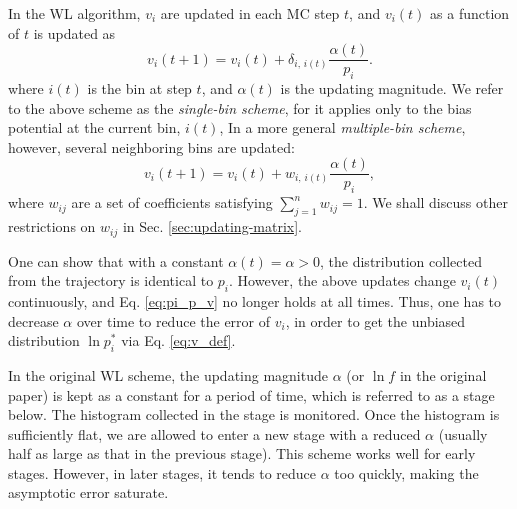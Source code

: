 \documentclass[reprint]{revtex4-1}
\begin{document}
In the WL algorithm\cite{wang2001, wang2001pre},
$v_i$ are updated
in each MC step $t$,
and $v_i(t)$ as a function of $t$
is updated as
%
\begin{equation}
  v_i(t+1)
  =
  v_i(t)
  +
  \delta_{i, \, i(t)}
  \frac{ \alpha(t) } { p_i }.
  \label{eq:wl_update}
\end{equation}
%
where $i(t)$ is the bin at step $t$,
and $\alpha(t)$ is the updating magnitude.
%
We refer to the above scheme as the \emph{single-bin scheme},
for it applies only to the bias potential
at the current bin, $i(t)$,
%
In a more general \emph{multiple-bin scheme}, however,
several neighboring bins are updated:
%
\begin{equation}
  v_i(t+1)
  =
  v_i(t)
  +
  w_{i, \, i(t)}
  \frac{ \alpha(t) } { p_i },
  \label{eq:mbin_update}
\end{equation}
%
where $w_{ij}$ are a set of coefficients satisfying
$\sum_{j=1}^n w_{ij} = 1$.
%
We shall discuss other restrictions on $w_{ij}$
in Sec. \ref{sec:updating-matrix}.



One can show that with a constant $\alpha(t) = \alpha > 0$,
the distribution collected from
the trajectory is identical to $p_i$.
%
However, the above updates
change $v_i(t)$ continuously,
and Eq. \eqref{eq:pi_p_v} no longer holds
at all times.
%
Thus, one has to decrease $\alpha$ over time
to reduce the error of $v_i$,
in order to get the unbiased distribution
$\ln p_i^*$ via Eq. \eqref{eq:v_def}.





In the original WL scheme,
the updating magnitude $\alpha$ (or $\ln f$
in the original paper) is kept as a constant
for a period of time,
which is referred to as a stage below.
%
The histogram collected in the stage is monitored.
%
Once the histogram is sufficiently flat,
we are allowed to enter a new stage
with a reduced $\alpha$\cite{wang2001, wang2001pre}
(usually half as large as
that in the previous stage).
%
This scheme works well for early stages.
%
However, in later stages, it tends to reduce $\alpha$
too quickly, making the asymptotic error
saturate\cite{belardinelli2007, belardinelli2007jcp, belardinelli2008}.
\end{document}
